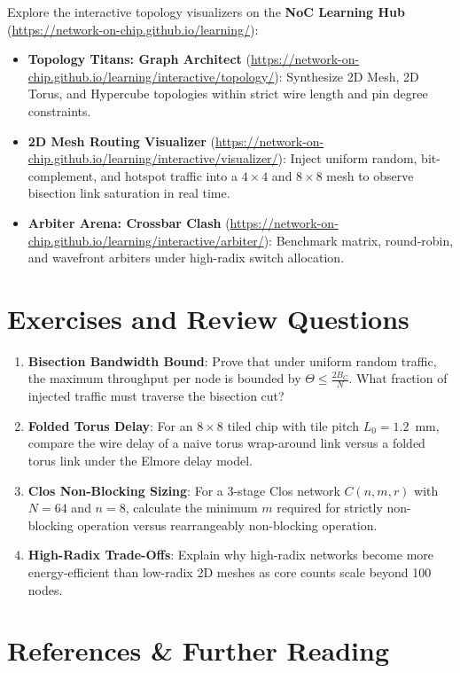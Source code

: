 Explore the interactive topology visualizers on the \textbf{NoC Learning Hub} (\url{https://network-on-chip.github.io/learning/}):
\begin{itemize}
    \item \textbf{Topology Titans: Graph Architect} (\url{https://network-on-chip.github.io/learning/interactive/topology/}): Synthesize 2D Mesh, 2D Torus, and Hypercube topologies within strict wire length and pin degree constraints.
    \item \textbf{2D Mesh Routing Visualizer} (\url{https://network-on-chip.github.io/learning/interactive/visualizer/}): Inject uniform random, bit-complement, and hotspot traffic into a $4 \times 4$ and $8 \times 8$ mesh to observe bisection link saturation in real time.
    \item \textbf{Arbiter Arena: Crossbar Clash} (\url{https://network-on-chip.github.io/learning/interactive/arbiter/}): Benchmark matrix, round-robin, and wavefront arbiters under high-radix switch allocation.
\end{itemize}

\section{Exercises and Review Questions}
\label{sec:ch4_exercises}

\begin{enumerate}
    \item \textbf{Bisection Bandwidth Bound}: Prove that under uniform random traffic, the maximum throughput per node is bounded by $\Theta \le \frac{2 B_C}{N}$. What fraction of injected traffic must traverse the bisection cut?
    \item \textbf{Folded Torus Delay}: For an $8 \times 8$ tiled chip with tile pitch $L_0 = 1.2$~mm, compare the wire delay of a naive torus wrap-around link versus a folded torus link under the Elmore delay model.
    \item \textbf{Clos Non-Blocking Sizing}: For a 3-stage Clos network $C(n, m, r)$ with $N = 64$ and $n = 8$, calculate the minimum $m$ required for strictly non-blocking operation versus rearrangeably non-blocking operation.
    \item \textbf{High-Radix Trade-Offs}: Explain why high-radix networks become more energy-efficient than low-radix 2D meshes as core counts scale beyond 100 nodes.
\end{enumerate}

\section{References \& Further Reading}
\label{sec:ch4_references}

